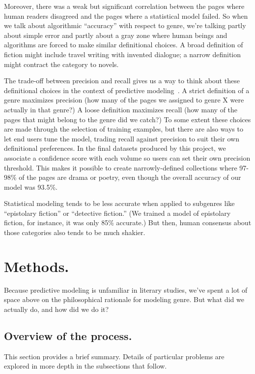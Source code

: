 \documentclass[paper=a4, fontsize=12pt]{scrartcl}
\numberwithin{equation}{section}		%
\numberwithin{figure}{section}			%
\numberwithin{table}{section}				%
\begin{document}
Moreover, there was a weak but significant correlation between the pages where human readers disagreed and the pages where a statistical model failed. So when we talk about algorithmic ``accuracy'' with respect to genre, we're talking partly about simple error and partly about a gray zone where human beings and algorithms are forced to make similar definitional choices. A broad definition of fiction might include travel writing with invented dialogue; a narrow definition might contract the category to novels.

The trade-off between precision and recall gives us a way to think about these definitional choices in the context of predictive modeling~\cite{buckland:recall}. A strict definition of a genre maximizes precision (how many of the pages we assigned to genre X were actually in that genre?) A loose definition maximizes recall (how many of the pages that might belong to the genre did we catch?) To some extent these choices are made through the selection of training examples, but there are also ways to let end users tune the model, trading recall against precision to suit their own definitional preferences. In the final datasets produced by this project, we associate a confidence score with each volume so users can set their own precision threshold. This makes it possible to create narrowly-defined collections where 97-98\% of the pages are drama or poetry, even though the overall accuracy of our model was 93.5\%.

Statistical modeling tends to be less accurate when applied to subgenres like ``epistolary fiction'' or ``detective fiction.'' (We trained a model of epistolary fiction, for instance, it was only 85\% accurate.) But then, human consensus about those categories also tends to be much shakier.

\section{Methods.}

Because predictive modeling is unfamiliar in literary studies, we've spent a lot of space above on the philosophical rationale for modeling genre. But what did we actually do, and how did we do it?

\subsection{Overview of the process.}
This section provides a brief summary. Details of particular problems are explored in more depth in the subsections that follow. 
\end{document}
